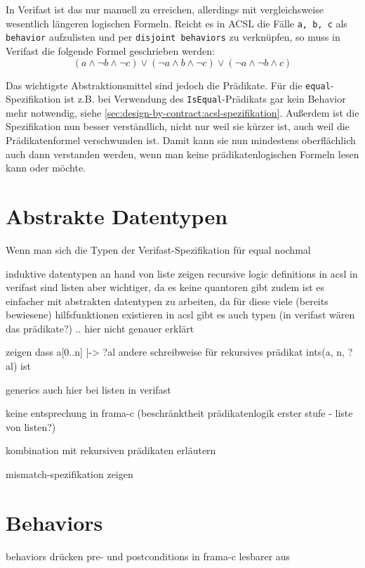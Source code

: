 In Verifast ist das nur manuell zu erreichen, allerdings mit vergleichsweise wesentlich längeren logischen Formeln.
Reicht es in ACSL die Fälle \lstinline{a, b, c} als \lstinline{behavior} aufzulisten und per \lstinline{disjoint behaviors}
zu verknüpfen, so muss in Verifast die folgende Formel geschrieben werden:
\[(a \land \neg b \land \neg c) \lor (\neg a \land b \land \neg c) \lor (\neg a \land \neg b \land c)\]

Das wichtigste Abstraktionsmittel sind jedoch die Prädikate. Für die \lstinline{equal}-Spezifikation ist 
z.B. bei Verwendung des \lstinline{IsEqual}-Prädikats gar kein Behavior mehr notwendig,
siehe \ref{sec:design-by-contract:acsl-spezifikation}. Außerdem ist die Spezifikation nun besser verständlich,
nicht nur weil sie kürzer ist, auch weil die Prädikatenformel verschwunden ist. Damit kann sie nun mindestens
oberflächlich auch dann verstanden werden, wenn man keine prädikatenlogischen Formeln lesen kann oder möchte.



\section{Abstrakte Datentypen}
\label{sec:abstrakte-datentypen}


Wenn man sich die Typen der Verifast-Spezifikation für equal nochmal 

induktive datentypen an hand von liste zeigen
recursive logic definitions in acsl
in verifast sind listen aber wichtiger, da es keine quantoren gibt
zudem ist es einfacher mit abstrakten datentypen zu arbeiten, da für diese viele (bereits bewiesene)
hilfsfunktionen existieren
in acsl gibt es auch typen (in verifast wären das prädikate?) .. hier nicht genauer erklärt 

zeigen dass a[0..n] |-> ?al andere schreibweise für rekursives prädikat ints(a, n, ?al) ist

generics auch hier bei listen in verifast

keine entsprechung in frama-c (beschränktheit prädikatenlogik erster stufe - liste von listen?)


kombination mit rekursiven prädikaten erläutern


mismatch-spezifikation zeigen


\section{Behaviors}


behaviors drücken pre- und postconditions in frama-c lesbarer aus



